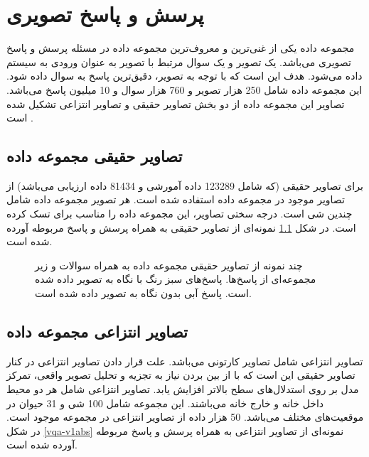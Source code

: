 \chapter{پرسش و پاسخ تصویری}
\thispagestyle{empty}

مجموعه داده
\href{https://visualqa.org/vqa_v1_download.html}{}
یکی از غنی‌ترین و معروف‌‌ترین مجموعه داده در مسئله پرسش و پاسخ تصویری می‌باشد. یک تصویر و یک سوال مرتبط با تصویر به عنوان ورودی به سیستم داده می‌شود. هدف این است که با توجه به تصویر، دقیق‌ترین پاسخ به سوال داده شود. این مجموعه داده شامل 250 هزار تصویر و 760 هزار سوال و 10 میلیون پاسخ می‌باشد. تصاویر این مجموعه داده از دو بخش تصاویر حقیقی
و تصاویر انتزاعی
تشکیل شده است  \cite{antol2015vqa}.
\section{تصاویر حقیقی مجموعه داده
	}
برای تصاویر حقیقی (که شامل 123289 داده آمورشی و 81434 داده ارزیابی می‌باشد) از تصاویر موجود در مجموعه داده  
  \cite{lin2015microsoft}
استفاده شده است. هر تصویر مجموعه داده 
شامل چندین شی است. درجه سختی تصاویر، این مجموعه داده را مناسب برای تسک  
کرده است. در شکل \ref{vqa-v1real} نمونه‌ای از تصاویر حقیقی به همراه پرسش و پاسخ مربوطه آورده شده است.

\begin{figure}
	\caption{چند نمونه از تصاویر حقیقی مجموعه داده  
	به همراه سوالات و زیر مجموعه‌ای از پاسخ‌ها. پاسخ‌های سبز رنگ با نگاه به تصویر داده شده است. پاسخ آبی بدون نگاه به تصویر داده شده است.  \cite{antol2015vqa}}
	\label{vqa-v1real}
\end{figure}

\section{تصاویر انتزاعی مجموعه داده
	}
تصاویر انتزاعی شامل تصاویر کارتونی می‌باشد. علت قرار دادن تصاویر انتزاعی در کنار تصاویر حقیقی این است که با از بین بردن نیاز به تجزیه و تحلیل تصویر واقعی، تمرکز مدل بر روی استدلال‌های سطح بالاتر افزایش یابد. تصاویر انتزاعی شامل هر دو محیط داخل خانه و خارج خانه می‌باشند. این مجموعه شامل 100 شی و 31 حیوان در موقعیت‌های مختلف می‌باشد. 50 هزار داده از تصاویر انتزاعی در مجموعه 
موجود است. در شکل \ref{vqa-v1abs} نمونه‌ای از تصاویر انتزاعی به همراه پرسش و پاسخ مربوطه آورده شده است.

